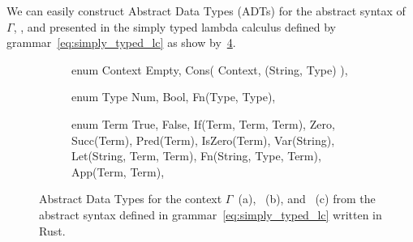 \documentclass[
  oneside,
  english,
  coorientadorbanca,
  noabntexcite
]{ufsc-thesis-rn46-2019}
\newcommand{\code}[1]{\text{\scpfamily\setlength\spaceskip{0.35em}#1}}
\begin{document}
We can easily construct Abstract Data Types (ADTs) for the abstract syntax of $\Gamma$, \code{term}, and \code{Type} presented in the simply typed lambda calculus defined by grammar~\eqref{eq:simply_typed_lc} as show by~\cref{fig:typeof_adt}.

\begin{figure}[ht]
  \centering
  \begin{subfigure}[b]{0.3\textwidth}
    \begin{minipage}{\textwidth}
      \begin{rustcode}
enum Context {
  Empty,
  Cons(
    Context,
    (String, Type)
  ),
}
      \end{rustcode}
    \end{minipage}
    \caption{
    }\label{fig:typeof_context_adt}
  \end{subfigure}
  \quad
  \begin{subfigure}[b]{0.3\textwidth}
    \begin{minipage}{\textwidth}
      \begin{rustcode}
enum Type {
  Num,
  Bool,
  Fn(Type, Type),
}
      \end{rustcode}
    \end{minipage}
    \caption{}\label{fig:typeof_type_adt}
  \end{subfigure}
  \quad
  \begin{subfigure}[b]{0.3\textwidth}
    \begin{minipage}{\textwidth}
      \begin{rustcode}
enum Term {
  True,
  False,
  If(Term, Term, Term),
  Zero,
  Succ(Term),
  Pred(Term),
  IsZero(Term),
  Var(String),
  Let(String, Term, Term),
  Fn(String, Type, Term),
  App(Term, Term),
}
      \end{rustcode}
    \end{minipage}
    \caption{}\label{fig:typeof_term_adt}
  \end{subfigure}
  \caption{
    Abstract Data Types for the context $\Gamma$~(a), \code{Type}~(b), and \code{term}~(c) from the abstract syntax defined in grammar~\eqref{eq:simply_typed_lc} written in Rust.
  }\label{fig:typeof_adt}
\end{figure}
\end{document}
